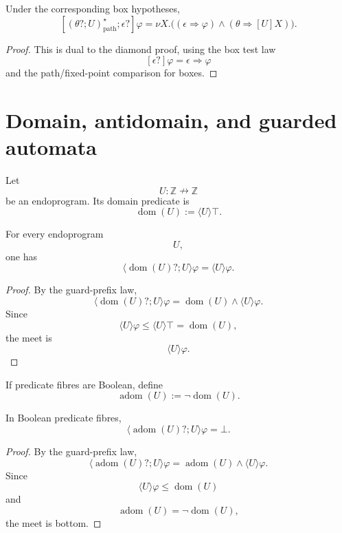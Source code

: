 \begin{theorem}
\label{thm:derived-poly-while-box}
Under the corresponding box hypotheses,
\[
\left[
(\theta?;U)^\star_{\mathrm{path}};\epsilon?
\right]\varphi
=
\nu X.\bigl(
(\epsilon\Rightarrow\varphi)
\wedge
(\theta\Rightarrow[U]X)
\bigr).
\]
\end{theorem}

\begin{proof}
This is dual to the diamond proof, using the box test law
\[
[\epsilon?]\varphi=\epsilon\Rightarrow\varphi
\]
and the path/fixed-point comparison for boxes.
\end{proof}

\section{Domain, antidomain, and guarded automata}
\label{sec:derived-poly-domain-automata}

Let
\[
U:\mathbb Z\nrightarrow\mathbb Z
\]
be an endoprogram.  Its domain predicate is
\[
\operatorname{dom}(U)
:=
\langle U\rangle\top.
\]

\begin{proposition}
\label{prop:derived-poly-domain-prefix}
For every endoprogram
\[
U,
\]
one has
\[
\langle\operatorname{dom}(U)?;U\rangle\varphi
=
\langle U\rangle\varphi.
\]
\end{proposition}

\begin{proof}
By the guard-prefix law,
\[
\langle\operatorname{dom}(U)?;U\rangle\varphi
=
\operatorname{dom}(U)\wedge\langle U\rangle\varphi.
\]
Since
\[
\langle U\rangle\varphi\le\langle U\rangle\top
=
\operatorname{dom}(U),
\]
the meet is
\[
\langle U\rangle\varphi.
\]
\end{proof}

If predicate fibres are Boolean, define
\[
\operatorname{adom}(U)
:=
\neg\operatorname{dom}(U).
\]

\begin{proposition}
\label{prop:derived-poly-antidomain-annihilation}
In Boolean predicate fibres,
\[
\langle\operatorname{adom}(U)?;U\rangle\varphi
=
\bot.
\]
\end{proposition}

\begin{proof}
By the guard-prefix law,
\[
\langle\operatorname{adom}(U)?;U\rangle\varphi
=
\operatorname{adom}(U)\wedge\langle U\rangle\varphi.
\]
Since
\[
\langle U\rangle\varphi\le\operatorname{dom}(U)
\]
and
\[
\operatorname{adom}(U)=\neg\operatorname{dom}(U),
\]
the meet is bottom.
\end{proof}

